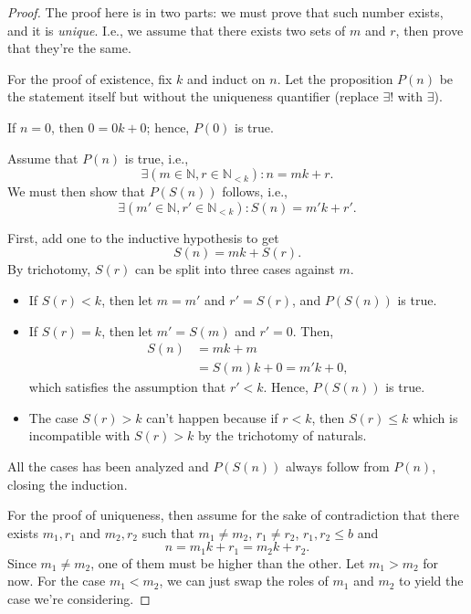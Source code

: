 \begin{proof}
  The proof here is in two parts: we must prove that such number exists, and it is \emph{unique}.
  I.e., we assume that there exists two sets of \(m\) and \(r\), then prove that they're the same.

  For the proof of existence, fix \(k\) and induct on \(n\). Let the proposition \(P(n)\) be the
  statement itself but without the uniqueness quantifier (replace \(\exists !\) with \(\exists\)).

  \basecase If \(n = 0\), then \(0 = 0k + 0\); hence, \(P(0)\) is true.

  \inductivestep Assume that \(P(n)\) is true, i.e.,
  \begin{equation}
    \exists (m \in \mathbb{N}, r \in \mathbb{N}_{<k}) : n = mk + r.
  \end{equation}
  We must then show that \(P(S(n))\) follows, i.e.,
  \begin{equation}
    \exists (m' \in \mathbb{N}, r' \in \mathbb{N}_{<k}) : S(n) = m'k + r'.
  \end{equation}

  First, add one to the inductive hypothesis to get
  \begin{equation}
    S(n) = mk + S(r).
  \end{equation}
  By trichotomy, \(S(r)\) can be split into three cases against \(m\).
  \begin{itemize}
    \item If \(S(r) < k\), then let \(m = m'\) and \(r' = S(r)\), and \(P(S(n))\) is true.
    \item If \(S(r) = k\), then let \(m' = S(m)\) and \(r' = 0\). Then,
          \begin{align}
            S(n) & = mk + m               \\
                 & = S(m)k + 0 = m'k + 0,
          \end{align}
          which satisfies the assumption that \(r' < k\). Hence, \(P(S(n))\) is true.
    \item The case \(S(r) > k\) can't happen because if \(r < k\), then \(S(r) \leq k\) which is
          incompatible with \(S(r) > k\) by the trichotomy of naturals.
  \end{itemize}
  All the cases has been analyzed and \(P(S(n))\) always follow from \(P(n)\), closing the
  induction.

  For the proof of uniqueness, then assume for the sake of contradiction that there exists
  \(m_1, r_1\) and \(m_2, r_2\) such that \(m_1 \neq m_2\), \(r_1 \neq r_2\), \(r_1, r_2 \leq b\)
  and
  \begin{equation}
    n = m_1 k + r_1 = m_2 k + r_2. \label{eq:naturals-euler_division-1}
  \end{equation}
  Since \(m_1 \neq m_2\), one of them must be higher than the other. Let \(m_1 > m_2\) for now. For
  the case \(m_1 < m_2\), we can just swap the roles of \(m_1\) and \(m_2\) to yield the case we're
  considering.


\end{proof}
